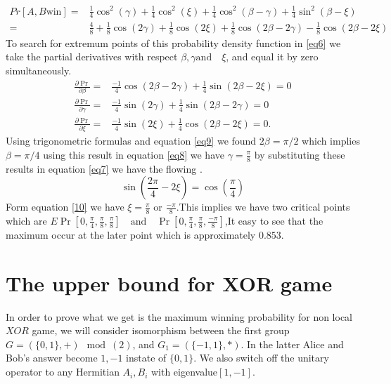 \begin{align}
Pr[A,B \text{win}]=& \frac{1}{4} \cos^2(\gamma)+\frac{1}{4} \cos^2(\xi)+\frac{1}{4} \cos^2(\beta-\gamma)+\frac{1}{4} \sin^2(\beta-\xi)\label{finpr}\\ 
=&\frac{4}{8} +\frac{1}{8}  \cos(2 \gamma)+\frac{1}{8}  \cos(2 \xi)+\frac{1}{8}  \cos(2\beta-2\gamma)-\frac{1}{8} \cos(2\beta-2\xi)\label{eq6}
\end{align}
To search for extremum points of this probability density function in \ref{eq6} we take the partial derivatives with respect $\beta ,\gamma  \text{and} \quad \xi$,  and equal it by zero simultaneously.
\begin{align}
\frac{\partial \Pr}{\partial \beta}=& \frac{-1}{4}\cos(2\beta-2\gamma)+ \frac{1}{4}\sin(2\beta-2\xi)=0\label{eq7} \\
\frac{\partial\Pr}{\partial \gamma}=& \frac{-1}{4}\sin(2\gamma)+ \frac{1}{4}\sin(2\beta-2\gamma)=0\label{eq8}\\
\frac{\partial \Pr}{\partial \xi}=& \frac{-1}{4}\sin(2\xi)+ \frac{1}{4}\cos(2\beta-2\xi)=0\label{eq9}.
\end{align}
Using trigonometric formulas and  equation  \ref{eq9} we found $2\beta=\pi/2$ which implies $\beta=\pi/4$
using this result in equation \ref{eq8} we have $ \gamma=\frac{\pi}{8}$ by substituting these results in equation \ref{eq7} we have the flowing .
\begin{equation}
\sin(\frac{2\pi}{4}-2\xi)=\cos(\frac{\pi}{4})\label{10}
\end{equation}
Form   equation  \ref{10} we have $\xi=\frac{\pi}{8}$ or $\frac{-\pi}{8}$.This implies we have two critical points which are $E\Pr[0,\frac{\pi}{4},\frac{\pi}{8} ,\frac{\pi}{8}] \quad \text{and}\quad \Pr[0,\frac{\pi}{4},\frac{\pi}{8} ,\frac{-\pi}{8}]$,It easy to see that the maximum occur at the  later  point which is  approximately $0.853$.



\section{The upper bound for XOR game}\hfill \break
In order to prove what we get is the maximum winning  probability for  non local $XOR$ game, we will consider isomorphism between  the first group $G=(\{0,1\},+) \mod(2)$, and $ G_1=(\{-1,1\},*)$. In the latter Alice and Bob's answer become ${1,-1}$ instate of $\{0,1\}$. We also switch off the unitary operator to any Hermitian $A_i,B_i$ with eigenvalue$[1,-1]$.

